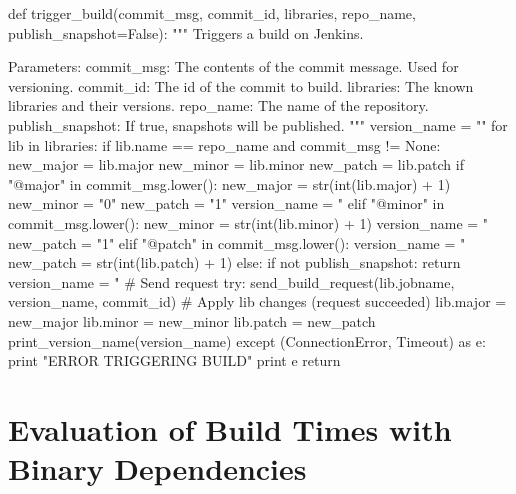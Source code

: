 \begin{pythoncode}[caption=Part of the git hook responsible for setting library version names and triggering Jenkins,label=lst:git_hook_trigger_build]
def trigger_build(commit_msg, commit_id, libraries, repo_name, publish_snapshot=False):
    """
    Triggers a build on Jenkins.

    Parameters:
        commit_msg:       The contents of the commit message. Used for versioning.
        commit_id:        The id of the commit to build.
        libraries:        The known libraries and their versions.
        repo_name:        The name of the repository.
        publish_snapshot: If true, snapshots will be published.
    """
    version_name = ""
    for lib in libraries:
        if lib.name == repo_name and commit_msg != None:
            new_major = lib.major
            new_minor = lib.minor
            new_patch = lib.patch
            if "@major" in commit_msg.lower():
                new_major = str(int(lib.major) + 1)
                new_minor = "0"
                new_patch = "1"
                version_name = "%
            elif "@minor" in commit_msg.lower():
                new_minor = str(int(lib.minor) + 1)
                version_name = "%
                new_patch = "1"
            elif "@patch" in commit_msg.lower():
                version_name = "%
                new_patch = str(int(lib.patch) + 1)
            else:
                if not publish_snapshot:
                    return
                version_name = "%
            # Send request
            try:
                send_build_request(lib.jobname, version_name, commit_id)
                # Apply lib changes (request succeeded)
                lib.major = new_major
                lib.minor = new_minor
                lib.patch = new_patch
                print_version_name(version_name)
            except (ConnectionError, Timeout) as e:
                print "ERROR TRIGGERING BUILD"
                print e
            return
\end{pythoncode}

\section{Evaluation of Build Times with Binary Dependencies}\label{sec:faster_build_evaluation}

